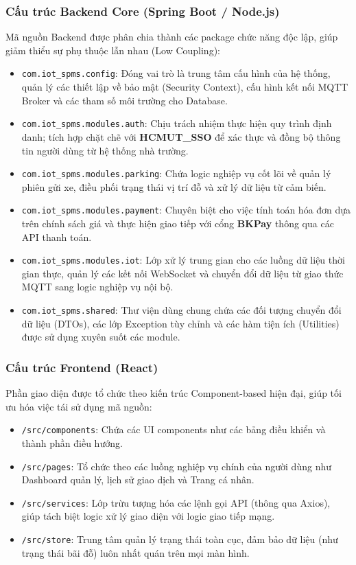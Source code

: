 \subsubsection{Cấu trúc Backend Core (Spring Boot / Node.js)}
Mã nguồn Backend được phân chia thành các package chức năng độc lập, giúp giảm thiểu sự phụ thuộc lẫn nhau (Low Coupling):
\begin{itemize}
    \item \texttt{com.iot\_spms.config}: Đóng vai trò là trung tâm cấu hình của hệ thống, quản lý các thiết lập về bảo mật (Security Context), cấu hình kết nối MQTT Broker và các tham số môi trường cho Database.
    \item \texttt{com.iot\_spms.modules.auth}: Chịu trách nhiệm thực hiện quy trình định danh; tích hợp chặt chẽ với \textbf{HCMUT\_SSO} để xác thực và đồng bộ thông tin người dùng từ hệ thống nhà trường.
    \item \texttt{com.iot\_spms.modules.parking}: Chứa logic nghiệp vụ cốt lõi về quản lý phiên gửi xe, điều phối trạng thái vị trí đỗ và xử lý dữ liệu từ cảm biến.
    \item \texttt{com.iot\_spms.modules.payment}: Chuyên biệt cho việc tính toán hóa đơn dựa trên chính sách giá và thực hiện giao tiếp với cổng \textbf{BKPay} thông qua các API thanh toán.
    \item \texttt{com.iot\_spms.modules.iot}: Lớp xử lý trung gian cho các luồng dữ liệu thời gian thực, quản lý các kết nối WebSocket và chuyển đổi dữ liệu từ giao thức MQTT sang logic nghiệp vụ nội bộ.
    \item \texttt{com.iot\_spms.shared}: Thư viện dùng chung chứa các đối tượng chuyển đổi dữ liệu (DTOs), các lớp Exception tùy chỉnh và các hàm tiện ích (Utilities) được sử dụng xuyên suốt các module.
\end{itemize}

\subsubsection{Cấu trúc Frontend (React)}
Phần giao diện được tổ chức theo kiến trúc Component-based hiện đại, giúp tối ưu hóa việc tái sử dụng mã nguồn:
\begin{itemize}
    \item \texttt{/src/components}: Chứa các UI components như  các bảng điều khiển và thành phần điều hướng.
    \item \texttt{/src/pages}: Tổ chức theo các luồng nghiệp vụ chính của người dùng như Dashboard quản lý, lịch sử giao dịch và Trang cá nhân.
    \item \texttt{/src/services}: Lớp trừu tượng hóa các lệnh gọi API (thông qua Axios), giúp tách biệt logic xử lý giao diện với logic giao tiếp mạng.
    \item \texttt{/src/store}: Trung tâm quản lý trạng thái toàn cục, đảm bảo dữ liệu (như trạng thái bãi đỗ) luôn nhất quán trên mọi màn hình.
\end{itemize}

